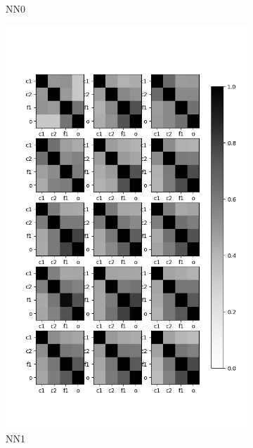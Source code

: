 \documentclass[11pt, twocolumn]{article}
\begin{document}
\begin{figure}
\begin{subfigure}[b]{0.3\textwidth}
		\caption[]%
		{{\small NN0}}    
		\label{fig:nn0}
	\end{subfigure}
	\hfill
	\begin{subfigure}[b]{0.3\textwidth}  
		\centering 
		\includegraphics[width=\textwidth]{figs/nn2_sim.png}
		\caption[]%
		{{\small NN1}}    
		\label{fig:nn1}
	\end{subfigure}
	\hfill
	\begin{subfigure}[b]{0.3\textwidth}  
		\centering 

\end{subfigure}
\end{figure}
\end{document}
